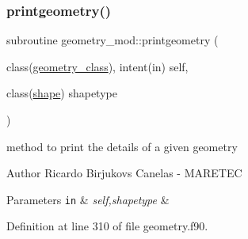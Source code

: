 \subsubsection{\texorpdfstring{printgeometry()}{printgeometry()}}
{\footnotesize\ttfamily subroutine geometry\+\_\+mod\+::printgeometry (\begin{DoxyParamCaption}\item[{class(\mbox{\hyperlink{structgeometry__mod_1_1geometry__class}{geometry\+\_\+class}}), intent(in)}]{self,  }\item[{class(\mbox{\hyperlink{structgeometry__mod_1_1shape}{shape}})}]{shapetype }\end{DoxyParamCaption})\hspace{0.3cm}{\ttfamily [private]}}



method to print the details of a given geometry 

\begin{DoxyAuthor}{Author}
Ricardo Birjukovs Canelas -\/ M\+A\+R\+E\+T\+EC 
\end{DoxyAuthor}

\begin{DoxyParams}[1]{Parameters}
\mbox{\tt in}  & {\em self,shapetype} & \\
\hline
\end{DoxyParams}


Definition at line 310 of file geometry.\+f90.



